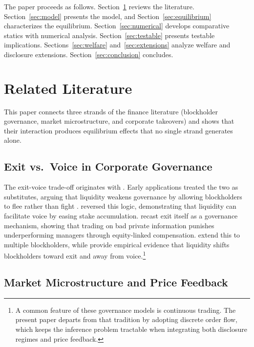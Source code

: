 \documentclass[11pt]{article}
\newcommand{\1}{\mathbf{1}}
\begin{document}
The paper proceeds as follows. Section~\ref{sec:lit} reviews the literature. Section~\ref{sec:model} presents the model, and Section~\ref{sec:equilibrium} characterizes the equilibrium. Section~\ref{sec:numerical} develops comparative statics with numerical analysis. Section~\ref{sec:testable} presents testable implications. Sections~\ref{sec:welfare} and~\ref{sec:extensions} analyze welfare and disclosure extensions. Section~\ref{sec:conclusion} concludes.
\section{Related Literature}
\label{sec:lit}

This paper connects three strands of the finance literature (blockholder governance, market microstructure, and corporate takeovers) and shows that their interaction produces equilibrium effects that no single strand generates alone.

%
\subsection{Exit vs.\ Voice in Corporate Governance}
%

The exit-voice trade-off originates with \citet{Hirschman1970}. Early applications treated the two as substitutes, arguing that liquidity weakens governance by allowing blockholders to flee rather than fight \citep{Coffee1991,Bhide1993}. \citet{Maug1998} reversed this logic, demonstrating that liquidity can facilitate voice by easing stake accumulation. \citet{Edmans2009} recast exit itself as a governance mechanism, showing that trading on bad private information punishes underperforming managers through equity-linked compensation. \citet{EdmansManso2011} extend this to multiple blockholders, while \citet{EdmansFangZur2013} provide empirical evidence that liquidity shifts blockholders toward exit and away from voice.\footnote{A common feature of these governance models is continuous trading. The present paper departs from that tradition by adopting discrete order flow, which keeps the inference problem tractable when integrating both disclosure regimes and price feedback.}

%
\subsection{Market Microstructure and Price Feedback}
%
\end{document}
